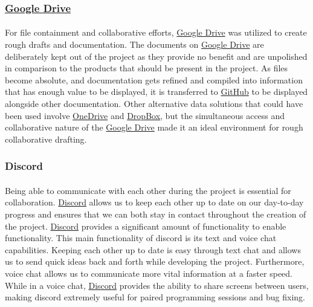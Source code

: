 \documentclass[12pt]{article}
\begin{document}
\subsubsection{\href{https://drive.google.com}{Google Drive}}
\paragraph{}	For file containment and collaborative efforts, \href{https://drive.google.com}{Google Drive} was utilized to create rough drafts and documentation. The documents on \href{https://drive.google.com}{Google Drive} are deliberately kept out of the project as they provide no benefit and are unpolished in comparison to the products that should be present in the project. As files become absolute, and documentation gets refined and compiled into information that has enough value to be displayed, it is transferred to \href{https://github.com}{GitHub} to be displayed alongside other documentation. Other alternative data solutions that could have been used involve \href{https://onedrive.live.com/}{OneDrive} and \href{https://dropbox.com}{DropBox}, but the simultaneous access and collaborative nature of the \href{https://drive.google.com}{Google Drive} made it an ideal environment for rough collaborative drafting. 

\subsubsection{Discord}
\paragraph{}
	Being able to communicate with each other during the project is essential for collaboration. \href{https://discordapp.com/}{Discord} allows us to keep each other up to date on our day-to-day progress and ensures that we can both stay in contact throughout the creation of the project. \href{https://discordapp.com/}{Discord} provides a significant amount of functionality to enable functionality. This main functionality of discord is its text and voice chat capabilities. Keeping each other up to date is easy through text chat and allows us to send quick ideas back and forth while developing the project. Furthermore, voice chat allows us to communicate more vital information at a faster speed. While in a voice chat, \href{https://discordapp.com/}{Discord} provides the ability to share screens between users, making discord extremely useful for paired programming sessions and bug fixing.

	
\end{document}
